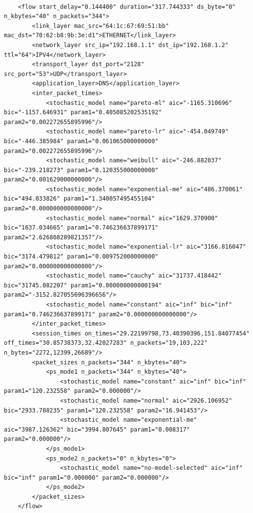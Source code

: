 \begin{verbatim}
               
    <flow start_delay="0.144400" duration="317.744333" ds_byte="0" n_kbytes="40" n_packets="344">
        <link_layer mac_src="64:1c:67:69:51:bb" mac_dst="70:62:b8:9b:3e:d1">ETHERNET</link_layer>
        <network_layer src_ip="192.168.1.1" dst_ip="192.168.1.2" ttl="64">IPV4</network_layer>
        <transport_layer dst_port="2128" src_port="53">UDP</transport_layer>
        <application_layer>DNS</application_layer>
        <inter_packet_times>
            <stochastic_model name="pareto-ml" aic="-1165.310696" bic="-1157.646931" param1="0.405085202535192" param2="0.002272655895996"/>
            <stochastic_model name="pareto-lr" aic="-454.049749" bic="-446.385984" param1="0.061065000000000" param2="0.002272655895996"/>
            <stochastic_model name="weibull" aic="-246.882037" bic="-239.218273" param1="0.120355000000000" param2="0.001629000000000"/>
            <stochastic_model name="exponential-me" aic="486.370061" bic="494.033826" param1="1.340057495455104" param2="0.000000000000000"/>
            <stochastic_model name="normal" aic="1629.370900" bic="1637.034665" param1="0.746236637899171" param2="2.626808289821357"/>
            <stochastic_model name="exponential-lr" aic="3166.816047" bic="3174.479812" param1="0.009752000000000" param2="0.000000000000000"/>
            <stochastic_model name="cauchy" aic="31737.418442" bic="31745.082207" param1="0.000000000000194" param2="-3152.827055696396656"/>
            <stochastic_model name="constant" aic="inf" bic="inf" param1="0.746236637899171" param2="0.000000000000000"/>
        </inter_packet_times>
        <session_times on_times="29.22199798,73.40390396,151.84077454" off_times="30.85738373,32.42027283" n_packets="19,103,222" n_bytes="2272,12399,26689"/>
        <packet_sizes n_packets="344" n_kbytes="40">
            <ps_mode1 n_packets="344" n_kbytes="40">
                <stochastic_model name="constant" aic="inf" bic="inf" param1="120.232558" param2="0.000000"/>
                <stochastic_model name="normal" aic="2926.106952" bic="2933.788235" param1="120.232558" param2="16.941453"/>
                <stochastic_model name="exponential-me" aic="3987.126362" bic="3994.807645" param1="0.008317" param2="0.000000"/>
            </ps_mode1>
            <ps_mode2 n_packets="0" n_kbytes="0">
                <stochastic_model name="no-model-selected" aic="inf" bic="inf" param1="0.000000" param2="0.000000"/>
            </ps_mode2>
        </packet_sizes>
    </flow>
    
\end{verbatim}

